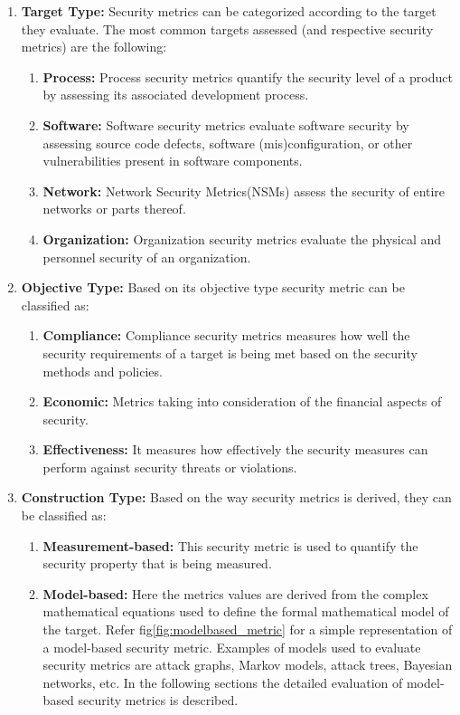 \documentclass[pdftex,english,oribibl]{llncs}
\begin{document}
\begin{enumerate}
	\item {\textbf{Target Type:} Security metrics can be categorized according to the target they evaluate. The most common targets assessed (and respective security metrics) are the following:}
	\begin{enumerate}
		\item {\textbf{Process:} Process security metrics quantify the security level of a product by assessing its associated development process.}
		\item {\textbf{Software:} Software security metrics evaluate software security by assessing source code defects, software (mis)configuration, or other vulnerabilities present in software components.}
		\item {\textbf{Network:} Network Security Metrics(NSMs) assess the security of entire networks or parts thereof.}
		\item {\textbf{Organization:} Organization security metrics evaluate the physical and personnel security of an organization.}
	\end{enumerate}

	\item {\textbf{Objective Type:} Based on its objective type security metric can be classified as:}
	\begin{enumerate}
	\item {\textbf{Compliance:} Compliance security metrics measures how well the security requirements of a target is being met based on the security methods and policies.}
	\item {\textbf{Economic:} Metrics taking into consideration of the financial aspects of security.}
	\item {\textbf{Effectiveness:} It measures how effectively the security measures can perform against security threats or violations.}
	\end{enumerate}

	\item {\textbf{Construction Type:} Based on the way security metrics is derived, they can be classified as:}
	\begin{enumerate}
	\item {\textbf{Measurement-based:} This security metric is used to quantify the security property that is being measured.}
	\item {\textbf{Model-based:} Here the metrics values are derived from the complex mathematical equations used to define the formal mathematical model of the target. Refer fig\ref{fig:modelbased_metric} for a simple representation of a model-based security metric. Examples of models used to evaluate security metrics are attack graphs, Markov models, attack trees, Bayesian networks, etc. In the following sections the detailed evaluation of model-based security metrics is described.}


\end{enumerate}
\end{enumerate}
\end{document}
